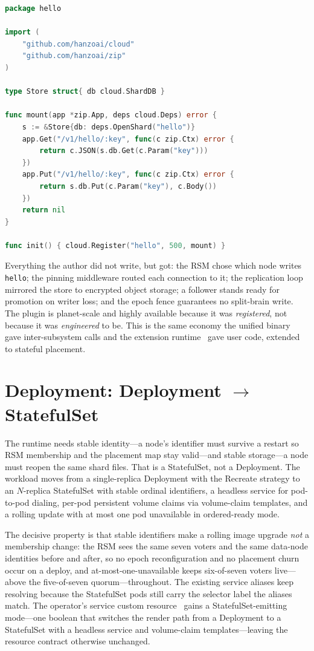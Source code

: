 \documentclass[11pt]{article}
\begin{document}
\begin{lstlisting}[language=Go]
package hello

import (
    "github.com/hanzoai/cloud"
    "github.com/hanzoai/zip"
)

type Store struct{ db cloud.ShardDB }

func mount(app *zip.App, deps cloud.Deps) error {
    s := &Store{db: deps.OpenShard("hello")}
    app.Get("/v1/hello/:key", func(c zip.Ctx) error {
        return c.JSON(s.db.Get(c.Param("key")))
    })
    app.Put("/v1/hello/:key", func(c zip.Ctx) error {
        return s.db.Put(c.Param("key"), c.Body())
    })
    return nil
}

func init() { cloud.Register("hello", 500, mount) }
\end{lstlisting}

Everything the author did not write, but got: the RSM chose which node writes
\texttt{hello}; the pinning middleware routed each connection to it; the
replication loop mirrored the store to encrypted object storage; a follower
stands ready for promotion on writer loss; and the epoch fence guarantees no
split-brain write. The plugin is planet-scale and highly available because it
was \emph{registered}, not because it was \emph{engineered} to be. This is the
same economy the unified binary~\cite{hip0106} gave inter-subsystem calls and
the extension runtime~\cite{hip0105} gave user code, extended to stateful
placement.

\section{Deployment: Deployment $\rightarrow$ StatefulSet}
\label{sec:deploy}

The runtime needs stable identity---a node's identifier must survive a restart
so RSM membership and the placement map stay valid---and stable storage---a
node must reopen the same shard files. That is a StatefulSet, not a
Deployment. The workload moves from a single-replica Deployment with the
Recreate strategy to an $N$-replica StatefulSet with stable ordinal
identifiers, a headless service for pod-to-pod dialing, per-pod persistent
volume claims via volume-claim templates, and a rolling update with at most
one pod unavailable in ordered-ready mode.

The decisive property is that stable identifiers make a rolling image upgrade
\emph{not} a membership change: the RSM sees the same seven voters and the same
data-node identities before and after, so no epoch reconfiguration and no
placement churn occur on a deploy, and at-most-one-unavailable keeps
six-of-seven voters live---above the five-of-seven quorum---throughout. The existing service aliases keep
resolving because the StatefulSet pods still carry the selector label the
aliases match. The operator's service custom resource~\cite{hip0112} gains a
StatefulSet-emitting mode---one boolean that switches the render path from a
Deployment to a StatefulSet with a headless service and volume-claim
templates---leaving the resource contract otherwise unchanged.
\end{document}
